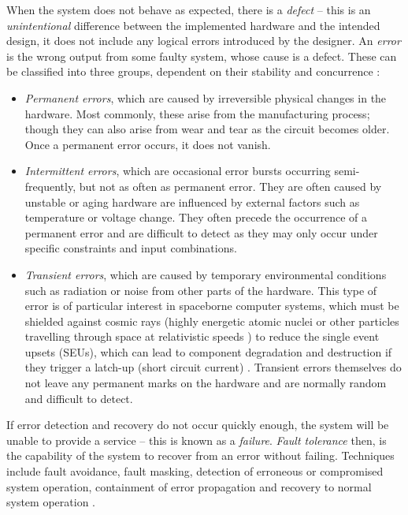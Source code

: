 \noindent When the system does not behave as expected, there is a \emph{defect} -- this is an \emph{unintentional} difference between the 
implemented hardware and the intended design, it does not include any logical errors introduced by the designer. An \emph{error} is the 
wrong output from some faulty system, whose cause is a defect. These can be classified into three groups, dependent on their stability 
and concurrence \cite{grandhi2019}:
\begin{itemize}
    \item \emph{Permanent errors}, which are caused by irreversible physical changes in the hardware. Most commonly, these arise from the 
    manufacturing process; though they can also arise from wear and tear as the circuit becomes older. Once a permanent error occurs, it 
    does not vanish.
    \item \emph{Intermittent errors}, which are occasional error bursts occurring semi-frequently, but not as often as permanent error. 
    They are often caused by unstable or aging hardware are influenced by external factors such as temperature or voltage change. They 
    often precede the occurrence of a permanent error and are difficult to detect as they may only occur under specific constraints and 
    input combinations.
    \item \emph{Transient errors}, which are caused by temporary environmental conditions such as radiation or noise from other parts of 
    the hardware. This type of error is of particular interest in spaceborne computer systems, which must be shielded against cosmic rays 
    (highly energetic atomic nuclei or other particles travelling through space at relativistic speeds \cite{drury2012origin}) to reduce 
    the single event upsets (SEUs), which can lead to component degradation and destruction if they trigger a latch-up (short circuit 
    current) \cite{leppala1989protection}. Transient errors themselves do not leave any permanent marks on the hardware and are normally 
    random and difficult to detect.
\end{itemize}

\noindent If error detection and recovery do not occur quickly enough, the system will be unable to provide a service -- this is known as 
a \emph{failure}. \emph{Fault tolerance} then, is the capability of the system to recover from an error without failing. Techniques 
include fault avoidance, fault masking, detection of erroneous or compromised system operation, containment of error propagation and 
recovery to normal system operation \cite{grandhi2019}.

